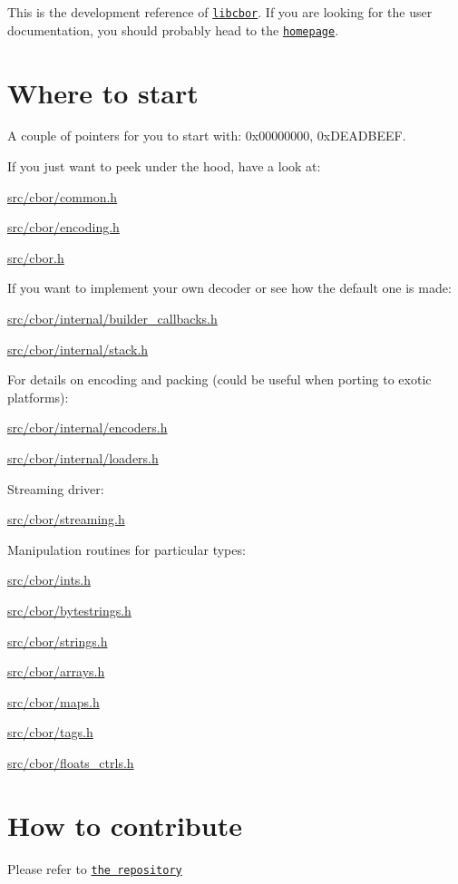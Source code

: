 This is the development reference of \href{http://libcbor.org/}{\tt libcbor}. If you are looking for the user documentation, you should probably head to the \href{http://libcbor.org/}{\tt homepage}.

\section*{Where to start}

A couple of pointers for you to start with\-: {\ttfamily 0x00000000}, {\ttfamily 0x\-D\-E\-A\-D\-B\-E\-E\-F}.

If you just want to peek under the hood, have a look at\-:
\begin{DoxyItemize}
\item \hyperlink{common_8h}{src/cbor/common.\-h}
\item \hyperlink{encoding_8h}{src/cbor/encoding.\-h}
\item \hyperlink{cbor_8h}{src/cbor.\-h}
\end{DoxyItemize}

If you want to implement your own decoder or see how the default one is made\-:
\begin{DoxyItemize}
\item \hyperlink{builder__callbacks_8h}{src/cbor/internal/builder\-\_\-callbacks.\-h}
\item \hyperlink{stack_8h}{src/cbor/internal/stack.\-h}
\end{DoxyItemize}

For details on encoding and packing (could be useful when porting to exotic platforms)\-:
\begin{DoxyItemize}
\item \hyperlink{encoders_8h}{src/cbor/internal/encoders.\-h}
\item \hyperlink{loaders_8h}{src/cbor/internal/loaders.\-h}
\end{DoxyItemize}

Streaming driver\-:
\begin{DoxyItemize}
\item \hyperlink{streaming_8h}{src/cbor/streaming.\-h}
\end{DoxyItemize}

Manipulation routines for particular types\-:
\begin{DoxyItemize}
\item \hyperlink{ints_8h}{src/cbor/ints.\-h}
\item \hyperlink{bytestrings_8h}{src/cbor/bytestrings.\-h}
\item \hyperlink{strings_8h}{src/cbor/strings.\-h}
\item \hyperlink{arrays_8h}{src/cbor/arrays.\-h}
\item \hyperlink{maps_8h}{src/cbor/maps.\-h}
\item \hyperlink{tags_8h}{src/cbor/tags.\-h}
\item \hyperlink{floats__ctrls_8h}{src/cbor/floats\-\_\-ctrls.\-h}
\end{DoxyItemize}

\section*{How to contribute}

Please refer to \href{https://github.com/PJK/libcbor}{\tt the repository} 